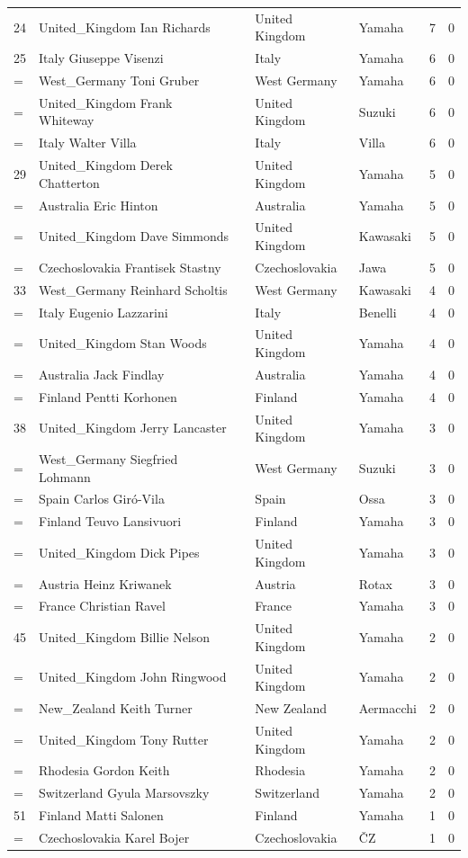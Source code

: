 \documentclass{article}
\begin{document}
\begin{tabular}{lllllll}
24 & United\_Kingdom Ian Richards &  & United Kingdom & Yamaha & 7 & 0 \\
25 & Italy Giuseppe Visenzi &  & Italy & Yamaha & 6 & 0 \\
= & West\_Germany Toni Gruber &  & West Germany & Yamaha & 6 & 0 \\
= & United\_Kingdom Frank Whiteway &  & United Kingdom & Suzuki & 6 & 0 \\
= & Italy Walter Villa &  & Italy & Villa & 6 & 0 \\
29 & United\_Kingdom Derek Chatterton &  & United Kingdom & Yamaha & 5 & 0 \\
= & Australia Eric Hinton &  & Australia & Yamaha & 5 & 0 \\
= & United\_Kingdom Dave Simmonds &  & United Kingdom & Kawasaki & 5 & 0 \\
= & Czechoslovakia Frantisek Stastny &  & Czechoslovakia & Jawa & 5 & 0 \\
33 & West\_Germany Reinhard Scholtis &  & West Germany & Kawasaki & 4 & 0 \\
= & Italy Eugenio Lazzarini &  & Italy & Benelli & 4 & 0 \\
= & United\_Kingdom Stan Woods &  & United Kingdom & Yamaha & 4 & 0 \\
= & Australia Jack Findlay &  & Australia & Yamaha & 4 & 0 \\
= & Finland Pentti Korhonen &  & Finland & Yamaha & 4 & 0 \\
38 & United\_Kingdom Jerry Lancaster &  & United Kingdom & Yamaha & 3 & 0 \\
= & West\_Germany Siegfried Lohmann &  & West Germany & Suzuki & 3 & 0 \\
= & Spain Carlos Giró-Vila &  & Spain & Ossa & 3 & 0 \\
= & Finland Teuvo Lansivuori &  & Finland & Yamaha & 3 & 0 \\
= & United\_Kingdom Dick Pipes &  & United Kingdom & Yamaha & 3 & 0 \\
= & Austria Heinz Kriwanek &  & Austria & Rotax & 3 & 0 \\
= & France Christian Ravel &  & France & Yamaha & 3 & 0 \\
45 & United\_Kingdom Billie Nelson &  & United Kingdom & Yamaha & 2 & 0 \\
= & United\_Kingdom John Ringwood &  & United Kingdom & Yamaha & 2 & 0 \\
= & New\_Zealand Keith Turner &  & New Zealand & Aermacchi & 2 & 0 \\
= & United\_Kingdom Tony Rutter &  & United Kingdom & Yamaha & 2 & 0 \\
= & Rhodesia Gordon Keith &  & Rhodesia & Yamaha & 2 & 0 \\
= & Switzerland Gyula Marsovszky &  & Switzerland & Yamaha & 2 & 0 \\
51 & Finland Matti Salonen &  & Finland & Yamaha & 1 & 0 \\
= & Czechoslovakia Karel Bojer &  & Czechoslovakia & ČZ & 1 & 0 \\
\bottomrule
\end{tabular}
\end{document}
